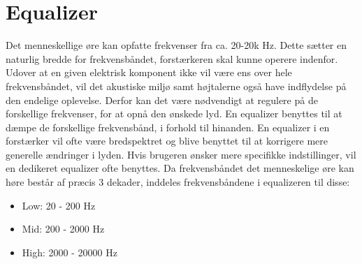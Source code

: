 \section{Equalizer}
\label{equalizer}
Det menneskellige øre kan opfatte frekvenser fra ca. 20-20k Hz. Dette sætter en naturlig bredde for frekvensbåndet, forstærkeren skal kunne operere indenfor. Udover at en given elektrisk komponent ikke vil være ens over hele frekvensbåndet, vil det akustiske miljø samt højtalerne også have indflydelse på den endelige oplevelse.  Derfor kan det være nødvendigt at regulere på de forskellige frekvenser, for at opnå den ønskede lyd. En equalizer benyttes til at dæmpe de forskellige frekvensbånd, i forhold til hinanden. En equalizer i en forstærker vil ofte være bredspektret og blive benyttet til at korrigere mere generelle ændringer i lyden. Hvis brugeren ønsker mere specifikke indstillinger, vil en dedikeret equalizer ofte benyttes. Da frekvensbåndet det menneskelige øre kan høre består af præcis 3 dekader, inddeles frekvensbåndene i equalizeren til disse:

\begin{itemize}
\item Low: 20 - 200 Hz
\item Mid: 200 - 2000 Hz
\item High: 2000 - 20000 Hz
\end{itemize}


